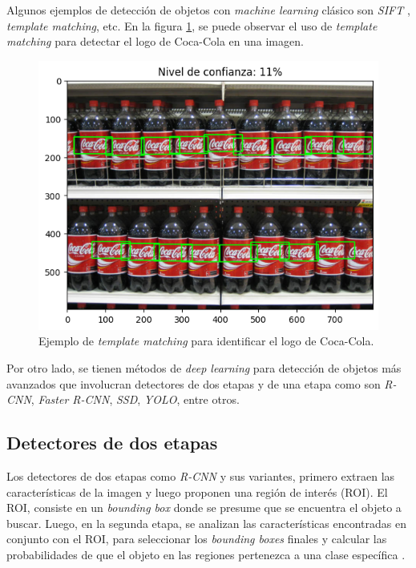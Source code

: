 Algunos ejemplos de detección de objetos con \textit{machine learning} clásico son \textit{SIFT} \cite{ARTICLE:18}, \textit{template matching}, etc. En la figura \ref{fig:tempMatch}, se puede observar el uso de \textit{template matching} para detectar el logo de Coca-Cola en una imagen.

\begin{figure}[ht]
	\centering
	\includegraphics[scale=.45]{./Figures/template_match.png}
	\caption{Ejemplo de \textit{template matching} para identificar el logo de Coca-Cola.}
	\label{fig:tempMatch}
\end{figure}

Por otro lado, se tienen métodos de \textit{deep learning} para detección de objetos más avanzados que involucran detectores de dos etapas y de una etapa como son \textit{R-CNN}, \textit{Faster R-CNN}, \textit{SSD}, \textit{YOLO}, entre otros.

\subsection{Detectores de dos etapas}

Los detectores de dos etapas como \textit{R-CNN} y sus variantes, primero extraen las características de la imagen y luego proponen una región de interés (ROI). El ROI, consiste en un \textit{bounding box} donde se presume que se encuentra el objeto a buscar. Luego, en la segunda etapa, se analizan las características encontradas en conjunto con el ROI, para seleccionar los \textit{bounding boxes} finales y calcular las probabilidades de que el objeto en las regiones pertenezca a una clase específica \cite{ARTICLE:8}. 

